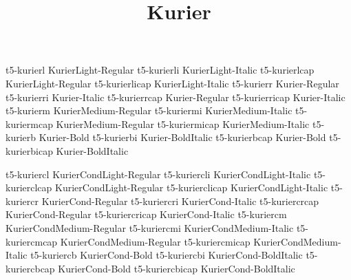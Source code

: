 \documentclass[test]{vnsample}
\title{Kurier}
\begin{document}
\begin{shortsample}
      {t5-kurierl}      {KurierLight-Regular}
     {t5-kurierli}     {KurierLight-Italic}
     {t5-kurierlcap}   {KurierLight-Regular}
   {t5-kurierlicap}  {KurierLight-Italic}
      {t5-kurierr}      {Kurier-Regular}
     {t5-kurierri}     {Kurier-Italic}
     {t5-kurierrcap}   {Kurier-Regular}
   {t5-kurierricap}  {Kurier-Italic}
     {t5-kurierm}      {KurierMedium-Regular}
    {t5-kuriermi}     {KurierMedium-Italic}
    {t5-kuriermcap}   {KurierMedium-Regular}
  {t5-kuriermicap}  {KurierMedium-Italic}
      {t5-kurierb}      {Kurier-Bold}
     {t5-kurierbi}     {Kurier-BoldItalic}
     {t5-kurierbcap}   {Kurier-Bold}
   {t5-kurierbicap}  {Kurier-BoldItalic}
\end{shortsample}
\clearpage
\begin{shortsample}
     {t5-kuriercl}     {KurierCondLight-Regular}
    {t5-kuriercli}    {KurierCondLight-Italic}
    {t5-kurierclcap}  {KurierCondLight-Regular}
  {t5-kurierclicap} {KurierCondLight-Italic}
     {t5-kuriercr}     {KurierCond-Regular}
    {t5-kuriercri}    {KurierCond-Italic}
    {t5-kuriercrcap}  {KurierCond-Regular}
  {t5-kuriercricap} {KurierCond-Italic}
    {t5-kuriercm}     {KurierCondMedium-Regular}
   {t5-kuriercmi}    {KurierCondMedium-Italic}
   {t5-kuriercmcap}  {KurierCondMedium-Regular}
 {t5-kuriercmicap} {KurierCondMedium-Italic}
     {t5-kuriercb}     {KurierCond-Bold}
    {t5-kuriercbi}    {KurierCond-BoldItalic}
    {t5-kuriercbcap}  {KurierCond-Bold}
  {t5-kuriercbicap} {KurierCond-BoldItalic}
\end{shortsample}
\end{document}
